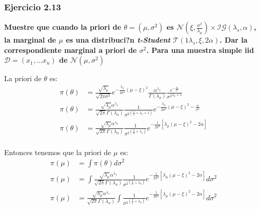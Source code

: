 \documentclass[12pt,]{article}
\begin{document}
\subsubsection{Ejercicio 2.13}\label{ejercicio-2.13}

\textbf{Muestre que cuando la priori de \(\theta=(\mu, \sigma^2)\) es
\(\mathcal{N}(\xi,\frac{\sigma^2}{\lambda_\mu})\times \mathcal{IG}(\lambda_s,\alpha)\),
la marginal de \(\mu\) es una distribuci?n \emph{t-Student}
\(\mathcal{T}(1\lambda_s,\xi,2\alpha)\). Dar la correspondiente marginal
a priori de \(\sigma^2\). Para una muestra simple iid
\(\mathcal{D}=(x_1,...x_n)\) de \(\mathcal{N}(\mu,\sigma^2)\)}

La priori de \(\theta\) es: \[
\begin{array}{rl}
\pi(\theta) & =\frac{\sqrt{\lambda_\mu}}{\sqrt{2\pi \sigma^2}}e^{-\frac{\lambda_\mu}{2\sigma^2}(\mu-\xi)^2}\frac{\alpha^{\lambda_\sigma}}{\Gamma(\lambda_\sigma)}\frac{e^{-\frac{\alpha}{\sigma^2}}}{{\sigma^2}^{\lambda_\sigma+1}}\\
\pi(\theta) & =\frac{\sqrt{\lambda_\mu}\alpha^{\lambda_\sigma}}{\sqrt{2\pi }\Gamma(\lambda_\sigma)}\frac{1}{{\sigma^2}^{(\frac{1}{2}+\lambda_\sigma+1)}}e^{-\frac{\lambda_\mu}{2\sigma^2}(\mu-\xi)^2-\frac{\alpha}{\sigma^2}}\\
\pi(\theta) & =\frac{\sqrt{\lambda_\mu}\alpha^{\lambda_\sigma}}{\sqrt{2\pi }\Gamma(\lambda_\sigma)}\frac{1}{{\sigma^2}^{(\frac{3}{2}+\lambda_\sigma)}}e^{-\frac{1}{2\sigma^2}[\lambda_\mu(\mu-\xi)^2-2\alpha]}\\
\end{array}
\]

Entonces tenemos que la priori de \(\mu\) es: \[
\begin{array}{rl}
\pi(\mu) & =\displaystyle \int \pi(\theta)d\sigma^2\\
\pi(\mu) & =\displaystyle \int \frac{\sqrt{\lambda_\mu}\alpha^{\lambda_\sigma}}{\sqrt{2\pi }\Gamma(\lambda_\sigma)}\frac{1}{{\sigma^2}^{(\frac{3}{2}+\lambda_\sigma)}}e^{-\frac{1}{2\sigma^2}[\lambda_\mu(\mu-\xi)^2-2\alpha]}d\sigma^2\\
\pi(\mu) & =\displaystyle \frac{\sqrt{\lambda_\mu}\alpha^{\lambda_\sigma}}{\sqrt{2\pi }\Gamma(\lambda_\sigma)} \int \frac{1}{{\sigma^2}^{(\frac{3}{2}+\lambda_\sigma)}}e^{-\frac{1}{2\sigma^2}[\lambda_\mu(\mu-\xi)^2-2\alpha]}d\sigma^2
\end{array}
\]
\end{document}
